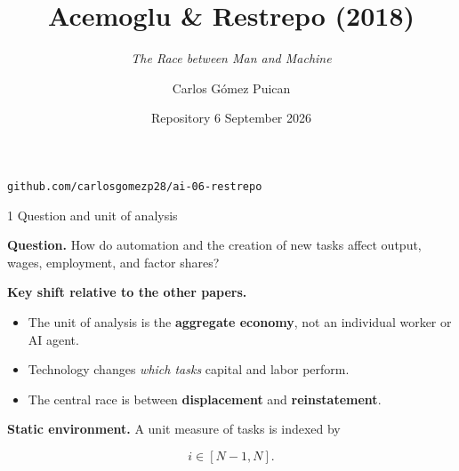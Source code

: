 \documentclass[aspectratio=169,11pt]{beamer}
\title{Acemoglu \& Restrepo (2018)}
\subtitle{\emph{The Race between Man and Machine}}
\author{Carlos Gómez Puican}
\date{Repository 6 \textperiodcentered{} September 2026}
\begin{document}

\begin{frame}[plain]
  \titlepage

  \begin{center}
    \small
    \texttt{github.com/carlosgomezp28/ai-06-restrepo}
  \end{center}
\end{frame}


\begin{frame}{1 \textperiodcentered{} Question and unit of analysis}

  \textbf{Question.}
  How do automation and the creation of new tasks affect output,
  wages, employment, and factor shares?

  \medskip

  \textbf{Key shift relative to the other papers.}

  \begin{itemize}\small
    \item The unit of analysis is the \textbf{aggregate economy},
    not an individual worker or AI agent.

    \item Technology changes \emph{which tasks} capital and labor perform.

    \item The central race is between
    \textbf{displacement} and \textbf{reinstatement}.
  \end{itemize}

  \medskip

  \textbf{Static environment.} A unit measure of tasks is indexed by

  \[
    i\in[N-1,N].
  \]

\end{frame}

\end{document}

